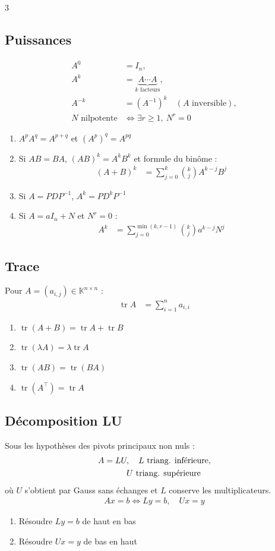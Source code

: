 \documentclass[12pt, a4paper]{article}
\newcommand{\KK}{\mathbb{K}}
\newcommand{\tr}{\operatorname{tr}}
\begin{document}
\begin{multicols*}{3}
\subsection{Puissances}
\begin{align*}
A^0&=I_n,\\
A^k&=\underbrace{A\cdots A}_{k\text{ facteurs}},\\
A^{-k}&=(A^{-1})^k\quad(A\text{ inversible}),\\
N\text{ nilpotente}&\iff\exists r\ge1,\ N^r=0
\end{align*}
\begin{enumerate}
\item $A^pA^q=A^{p+q}$ et $(A^p)^q=A^{pq}$
\item Si $AB=BA$, $(AB)^k=A^kB^k$ et formule du binôme :
\begin{align*}
(A+B)^k&=\sum_{j=0}^k\binom{k}{j}A^{k-j}B^j
\end{align*}
\item Si $A=PDP^{-1}$, $A^k=PD^kP^{-1}$ 
\item Si $A=aI_n+N$ et $N^r=0$ :
\begin{align*}
A^k&=\sum_{j=0}^{\min(k,r-1)}
\binom{k}{j}a^{k-j}N^j
\end{align*}
\end{enumerate}

\colbreak

\subsection{Trace}
Pour $A=(a_{i,j})\in\KK^{n\times n}$ :
\begin{align*}
\tr A&=\sum_{i=1}^n a_{i,i}
\end{align*}
\begin{enumerate}
\item $\tr(A+B)=\tr A+\tr B$
\item $\tr(\lambda A)=\lambda\tr A$
\item $\tr(AB)=\tr(BA)$
\item $\tr(A^\top)=\tr A$
\end{enumerate}


\subsection{Décomposition LU}
Sous les hypothèses des pivots principaux non nuls :
\begin{align*}
A&=LU,\quad L\text{ triang. inférieure},\\
&\hphantom{=LU,} U\text{ triang. supérieure}
\end{align*}
où $U$ s'obtient par Gauss sans échanges et $L$ conserve les multiplicateurs.
\begin{align*}
Ax=b\iff Ly=b,\quad Ux=y
\end{align*}
\begin{enumerate}
\item Résoudre $Ly=b$ de haut en bas
\item Résoudre $Ux=y$ de bas en haut
\end{enumerate}


\end{multicols*}
\end{document}
